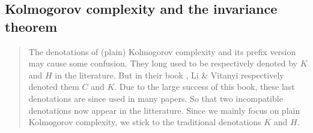 \subsection{Kolmogorov complexity and the invariance theorem}
\label{ss:invariance}
{\small\begin{quote}
\begin{note*}
The denotations of (plain) Kolmogorov complexity
and its prefix version may cause some confusion.
They long used to be respectively denoted by $K$ and $H$
in the literature.
But in their book \cite{livitanyi}, Li \& Vitanyi respectively
denoted them $C$ and $K$.
Due to the large success of this book, these last denotations
are since used in many papers.
So that two incompatible denotations now appear in the
litterature.
Since we mainly focus on plain Kolmogorov complexity,
we stick to the traditional denotations $K$ and $H$.
\end{note*}
\end{quote}}
